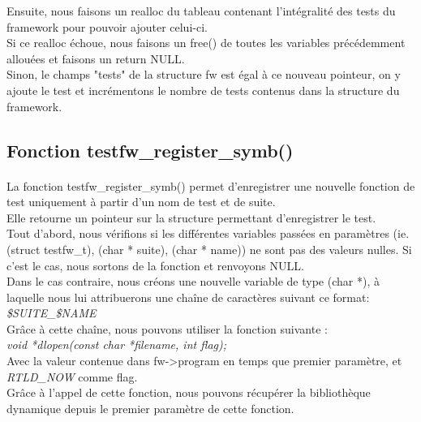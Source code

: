 \documentclass[12pt]{article}
\begin{document}
Ensuite, nous faisons un realloc du tableau contenant l'intégralité des tests du framework pour pouvoir ajouter celui-ci.\\

Si ce realloc échoue, nous faisons un free() de toutes les variables précédemment allouées et faisons un return NULL.\\
Sinon, le champs "tests" de la structure fw est égal à ce nouveau pointeur, on y ajoute le test et incrémentons le nombre de tests contenus dans la structure du framework.


\newpage
\subsection{Fonction testfw\_register\_symb()}

\paragraph{}
La fonction testfw\_register\_symb() permet d'enregistrer une nouvelle fonction de test uniquement à partir d'un nom de test et de suite.\\
Elle retourne un pointeur  sur la structure permettant d'enregistrer le test. \\

Tout d'abord, nous vérifions si les différentes variables passées en paramètres (ie. (struct testfw\_t), (char * suite), (char * name)) ne sont pas des valeurs nulles. Si c'est le cas, nous sortons de la fonction et renvoyons NULL.\\

Dans le cas contraire, nous créons une nouvelle variable de type (char *), à laquelle nous lui attribuerons une chaîne de caractères suivant ce format:\\
\textit{\$SUITE\_\$NAME}\\

Grâce à cette chaîne, nous pouvons utiliser la fonction suivante :\\
\textit{ void *dlopen(const char *filename, int flag);}\\

Avec la valeur contenue dans fw->program en temps que premier paramètre, et \textit{RTLD\_NOW} comme flag.\\

Grâce à l'appel de cette fonction, nous pouvons récupérer la bibliothèque dynamique depuis le premier paramètre de cette fonction.\\
\end{document}
